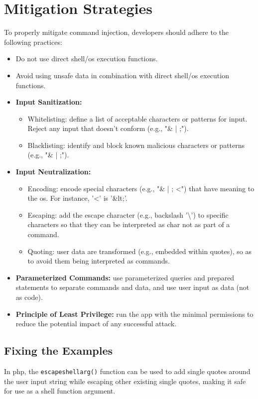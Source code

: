 \section{Mitigation Strategies}

To properly mitigate command injection, developers should adhere to the following practices:
\begin{itemize}
    \item Do not use direct shell/\gls{os} execution functions.
    \item Avoid using unsafe data in combination with direct shell/\gls{os} execution functions.
    \item \textbf{Input Sanitization:}
    \begin{itemize}
        \item Whitelisting: define a list of acceptable characters or patterns for input. Reject any input that doesn't conform (e.g., "\& | ;").
        \item Blacklisting: identify and block known malicious characters or patterns (e.g., "\& | ;").
    \end{itemize}
    \item \textbf{Input Neutralization:}
    \begin{itemize}
        \item Encoding: encode special characters (e.g., "\& | ; <") that have meaning to the \gls{os}. For instance, '<' is '\&lt;'.
        \item Escaping: add the escape character (e.g., backslash '\textbackslash') to specific characters so that they can be interpreted as char not as part of a command.
        \item Quoting: user data are transformed (e.g., embedded within quotes), so as to avoid them being interpreted as commands.
    \end{itemize}
    \item \textbf{Parameterized Commands:} use parameterized queries and prepared statements to separate commands and data, and use user input as data (not as code).
    \item \textbf{Principle of Least Privilege:} run the app with the minimal permissions to reduce the potential impact of any successful attack.
\end{itemize}

\subsection{Fixing the Examples}
In \gls{php}, the \texttt{escapeshellarg()} function can be used to add single quotes around the user input string while escaping other existing single quotes, making it safe for use as a shell function argument. 

